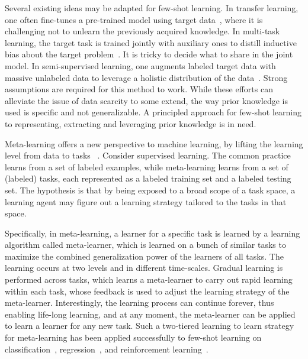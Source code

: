 \documentclass{article}
\begin{document}
Several existing ideas may be adapted for few-shot learning. In transfer learning, one often fine-tunes a pre-trained model using target data~\cite{sharif2014cnn}, where it is challenging not to unlearn the previously acquired knowledge. In multi-task learning, the target task is trained jointly with auxiliary ones to distill inductive bias about the target problem~\cite{caruana1998multitask}. It is tricky to decide what to share in the joint model. In semi-supervised learning, one augments labeled target data with massive unlabeled data to leverage a holistic distribution of the data~\cite{wu2012learning}. Strong assumptions are required for this method to work. While these efforts can alleviate the issue of data scarcity to some extend, the way prior knowledge is used is specific and not generalizable. A principled approach for few-shot learning to representing, extracting and leveraging prior knowledge is in need.



Meta-learning offers a new perspective to machine learning, by lifting the learning level from data to tasks ~\cite{schmidhuber1987evolutionary,bengio1991learning,thrun2012learning}. Consider supervised learning. The common practice learns from a set of labeled examples, while meta-learning learns from a set of (labeled) tasks, each represented as a labeled training set and a labeled testing set. The hypothesis is that by being exposed to a broad scope of a task space, a learning agent may figure out a learning strategy tailored to the tasks in that space.

Specifically, in meta-learning, a learner for a specific task is learned by a learning algorithm called meta-learner, which is learned on a bunch of similar tasks to maximize the combined generalization power of the learners of all tasks. The learning occurs at two levels and in different time-scales. Gradual learning is performed across tasks, which learns a meta-learner to carry out rapid learning within each task, whose feedback is used to adjust the learning strategy of the meta-learner. Interestingly, the learning process can continue forever, thus enabling life-long learning, and at any moment, the meta-learner can be applied to learn a learner for any new task. Such a two-tiered learning to learn strategy for meta-learning has been applied successfully to few-shot learning on  classification~\cite{santoro2016meta,vinyals2016matching,ravi2017optimization,finn2017model}, regression~\cite{santoro2016meta,finn2017model}, and reinforcement learning~\cite{wang2016learning,Yan2016reinf,finn2017model,mishra2017meta,sung2017learning}.
\end{document}

